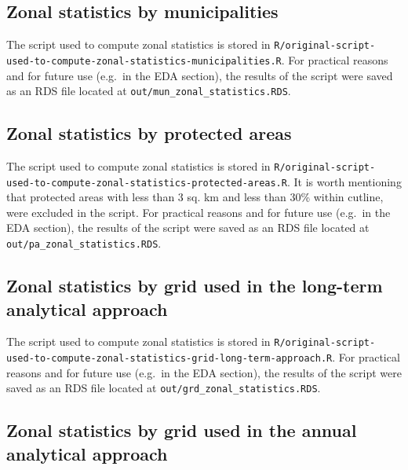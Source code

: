 \documentclass[10pt,landscape,a3paper]{article}
\begin{document}
\hypertarget{zonal-statistics-by-municipalities}{%
\subsection{Zonal statistics by
municipalities}\label{zonal-statistics-by-municipalities}}

The script used to compute zonal statistics is stored in
\texttt{R/original-script-used-to-compute-zonal-statistics-municipalities.R}.
For practical reasons and for future use (e.g.~in the EDA section), the
results of the script were saved as an RDS file located at
\texttt{out/mun\_zonal\_statistics.RDS}.

\hypertarget{zonal-statistics-by-protected-areas}{%
\subsection{Zonal statistics by protected
areas}\label{zonal-statistics-by-protected-areas}}

The script used to compute zonal statistics is stored in
\texttt{R/original-script-used-to-compute-zonal-statistics-protected-areas.R}.
It is worth mentioning that protected areas with less than 3 sq. km and
less than 30\% within cutline, were excluded in the script. For
practical reasons and for future use (e.g.~in the EDA section), the
results of the script were saved as an RDS file located at
\texttt{out/pa\_zonal\_statistics.RDS}.

\hypertarget{zonal-statistics-by-grid-used-in-the-long-term-analytical-approach}{%
\subsection{Zonal statistics by grid used in the long-term analytical
approach}\label{zonal-statistics-by-grid-used-in-the-long-term-analytical-approach}}

The script used to compute zonal statistics is stored in
\texttt{R/original-script-used-to-compute-zonal-statistics-grid-long-term-approach.R}.
For practical reasons and for future use (e.g.~in the EDA section), the
results of the script were saved as an RDS file located at
\texttt{out/grd\_zonal\_statistics.RDS}.

\hypertarget{zonal-statistics-by-grid-used-in-the-annual-analytical-approach}{%
\subsection{Zonal statistics by grid used in the annual analytical
approach}\label{zonal-statistics-by-grid-used-in-the-annual-analytical-approach}}
\end{document}
